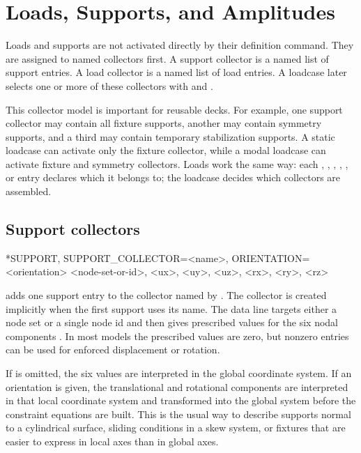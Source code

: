 \chapter{Loads, Supports, and Amplitudes}
\label{chap:loads-supports}

Loads and supports are not activated directly by their definition command. They are assigned to named collectors first. A support collector is a named list of support entries. A load collector is a named list of load entries. A loadcase later selects one or more of these collectors with  and .

This collector model is important for reusable decks. For example, one support collector may contain all fixture supports, another may contain symmetry supports, and a third may contain temporary stabilization supports. A static loadcase can activate only the fixture collector, while a modal loadcase can activate fixture and symmetry collectors. Loads work the same way: each , , , , , or  entry declares which  it belongs to; the loadcase decides which collectors are assembled.

\section{Support collectors}

\begin{syntax}
*SUPPORT, SUPPORT_COLLECTOR=<name>, ORIENTATION=<orientation>
<node-set-or-id>, <ux>, <uy>, <uz>, <rx>, <ry>, <rz>
\end{syntax}

 adds one support entry to the collector named by . The collector is created implicitly when the first support uses its name. The data line targets either a node set or a single node id and then gives prescribed values for the six nodal components \dofvec. In most models the prescribed values are zero, but nonzero entries can be used for enforced displacement or rotation.

If  is omitted, the six values are interpreted in the global coordinate system. If an orientation is given, the translational and rotational components are interpreted in that local coordinate system and transformed into the global system before the constraint equations are built. This is the usual way to describe supports normal to a cylindrical surface, sliding conditions in a skew system, or fixtures that are easier to express in local axes than in global axes.

